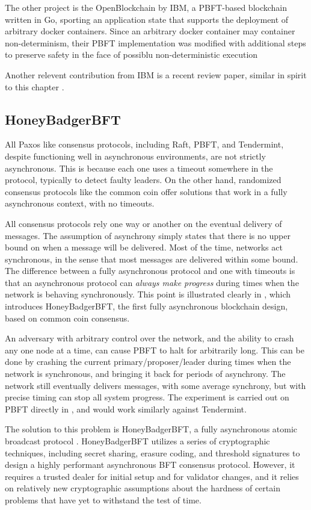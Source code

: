 The other project is the OpenBlockchain by IBM, a PBFT-based blockchain written in Go,
sporting an application state that supports the deployment of arbitrary docker containers.
Since an arbitrary docker container may container non-determinism, their PBFT implementation
was modified with additional steps to preserve safety in the face of possiblu non-deterministic execution \cite{cachin2016non}

Another relevent contribution from IBM is a recent review paper, similar in spirit to this chapter \cite{vukolic11quest}.

\subsection{HoneyBadgerBFT}

All Paxos like consensus protocols, including Raft, PBFT, and Tendermint, 
despite functioning well in asynchronous environments, are not strictly asynchronous.
This is because each one uses a timeout somewhere in the protocol, typically to detect faulty leaders.
On the other hand, randomized consensus protocols like the common coin offer solutions that work in 
a fully asynchronous context, with no timeouts.

All consensus protocols rely one way or another on the eventual delivery of messages.
The assumption of asynchrony simply states that there is no upper bound on when a message will be delivered.
Most of the time, networks act synchronous, in the sense that most messages are delivered within some bound.
The difference between a fully asynchronous protocol and one with timeouts is that 
an asynchronous protocol can \emph{always make progress} during times when the network is behaving synchronously.
This point is illustrated clearly in \cite{honeybadger}, which introduces HoneyBadgerBFT, 
the first fully asynchronous blockchain design, based on common coin consensus.

An adversary with arbitrary control over the network, 
and the ability to crash any one node at a time,
can cause PBFT to halt for arbitrarily long.
This can be done by crashing the current primary/proposer/leader during times when the network is synchronous,
and bringing it back for periods of asynchrony.
The network still eventually delivers messages, with some average synchrony,
but with precise timing can stop all system progress.
The experiment is carried out on PBFT directly in \cite{honeybadger}, and would work similarly against Tendermint.

The solution to this problem is HoneyBadgerBFT, a fully asynchronous atomic broadcast protocol \cite{honeybadger}.
HoneyBadgerBFT utilizes a series of cryptographic techniques, including secret sharing, erasure coding, 
and threshold signatures to design a highly performant asynchronous BFT consensus protocol.
However, it requires a trusted dealer for initial setup and for validator changes, 
and it relies on relatively new cryptographic assumptions about the hardness of certain problems that have 
yet to withstand the test of time.

